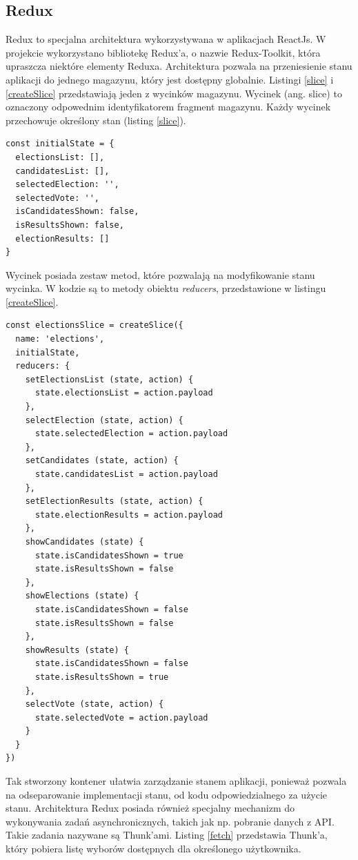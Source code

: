 \documentclass[a4paper,12pt]{book}
\begin{document}
\subsection{Redux}

Redux to specjalna architektura wykorzystywana w aplikacjach ReactJs. W projekcie wykorzystano bibliotekę Redux'a, o nazwie Redux-Toolkit, która upraszcza niektóre elementy Reduxa. Architektura pozwala na przeniesienie stanu aplikacji do jednego magazynu, który jest dostępny globalnie. Listingi \ref{slice} i  \ref{createSlice} przedstawiają jeden z wycinków magazynu. Wycinek (ang. slice) to oznaczony odpowednim identyfikatorem fragment magazynu. Każdy wycinek przechowuje określony stan (listing \ref{slice}).

\begin{lstlisting}[style=ES6, caption={Stan początkowy wycinka \textit{electionsSlice}.}, label={slice}]
const initialState = {
  electionsList: [],
  candidatesList: [],
  selectedElection: '',
  selectedVote: '',
  isCandidatesShown: false,
  isResultsShown: false,
  electionResults: []
}
\end{lstlisting}

Wycinek posiada zestaw metod, które pozwalają na modyfikowanie stanu wycinka. W kodzie są to metody obiektu \textit{reducers}, przedstawione w listingu \ref{createSlice}.

\begin{lstlisting}[style=ES6, caption={Wycinek \textit{electionsSlice}.}, label={createSlice}]
const electionsSlice = createSlice({
  name: 'elections',
  initialState,
  reducers: {
    setElectionsList (state, action) {
      state.electionsList = action.payload
    },
    selectElection (state, action) {
      state.selectedElection = action.payload
    },
    setCandidates (state, action) {
      state.candidatesList = action.payload
    },
    setElectionResults (state, action) {
      state.electionResults = action.payload
    },
    showCandidates (state) {
      state.isCandidatesShown = true
      state.isResultsShown = false
    },
    showElections (state) {
      state.isCandidatesShown = false
      state.isResultsShown = false
    },
    showResults (state) {
      state.isCandidatesShown = false
      state.isResultsShown = true
    },
    selectVote (state, action) {
      state.selectedVote = action.payload
    }
  }
})
\end{lstlisting}

Tak stworzony kontener ułatwia zarządzanie stanem aplikacji, ponieważ pozwala na odseparowanie implementacji stanu, od kodu odpowiedzialnego za użycie stanu. Architektura Redux posiada również specjalny mechanizm do wykonywania zadań asynchronicznych, takich jak np. pobranie danych z API. Takie zadania nazywane są Thunk'ami. Listing \ref{fetch} przedstawia Thunk'a, który pobiera listę wyborów dostępnych dla określonego użytkownika.
\end{document}
